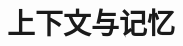 \setcounter{chapter}{24}

\hypertarget{ux4e0aux4e0bux6587ux4e0eux8bb0ux5fc6}{%
\chapter{上下文与记忆}\label{ux4e0aux4e0bux6587ux4e0eux8bb0ux5fc6}}
